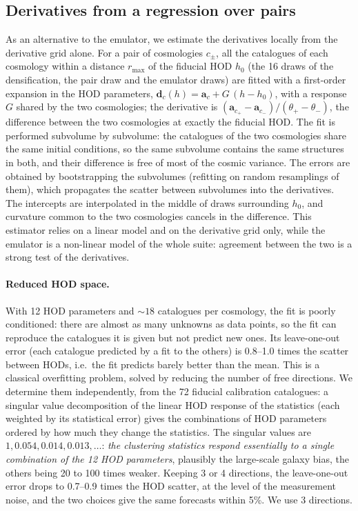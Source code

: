 \subsection{Derivatives from a regression over pairs}
\label{sec:regression}

As an alternative to the emulator, we estimate the derivatives locally from the derivative grid alone. For a pair of cosmologies $c_\pm$, all the catalogues of each cosmology within a distance $r_{\max}$ of the fiducial HOD $h_0$ (the 16 draws of the densification, the pair draw and the emulator draws) are fitted with a first-order expansion in the HOD parameters, $\boldsymbol d_c(h) = \boldsymbol a_c + G\,(h-h_0)$, with a response $G$ shared by the two cosmologies; the derivative is $(\boldsymbol a_{c_+}-\boldsymbol a_{c_-})/(\theta_+-\theta_-)$, the difference between the two cosmologies at exactly the fiducial HOD. The fit is performed subvolume by subvolume: the catalogues of the two cosmologies share the same initial conditions, so the same subvolume contains the same structures in both, and their difference is free of most of the cosmic variance. The errors are obtained by bootstrapping the subvolumes (refitting on random resamplings of them), which propagates the scatter between subvolumes into the derivatives. The intercepts are interpolated in the middle of draws surrounding $h_0$, and curvature common to the two cosmologies cancels in the difference. This estimator relies on a linear model and on the derivative grid only, while the emulator is a non-linear model of the whole suite: agreement between the two is a strong test of the derivatives.

\paragraph{Reduced HOD space.} With 12 HOD parameters and $\sim18$ catalogues per cosmology, the fit is poorly conditioned: there are almost as many unknowns as data points, so the fit can reproduce the catalogues it is given but not predict new ones. Its leave-one-out error (each catalogue predicted by a fit to the others) is 0.8--1.0 times the scatter between HODs, i.e.\ the fit predicts barely better than the mean. This is a classical overfitting problem, solved by reducing the number of free directions. We determine them independently, from the 72 fiducial calibration catalogues: a singular value decomposition of the linear HOD response of the statistics (each weighted by its statistical error) gives the combinations of HOD parameters ordered by how much they change the statistics. The singular values are $1, 0.054, 0.014, 0.013,\dots$: \emph{the clustering statistics respond essentially to a single combination of the 12 HOD parameters}, plausibly the large-scale galaxy bias, the others being 20 to 100 times weaker. Keeping 3 or 4 directions, the leave-one-out error drops to 0.7--0.9 times the HOD scatter, at the level of the measurement noise, and the two choices give the same forecasts within 5\%. We use 3 directions.

